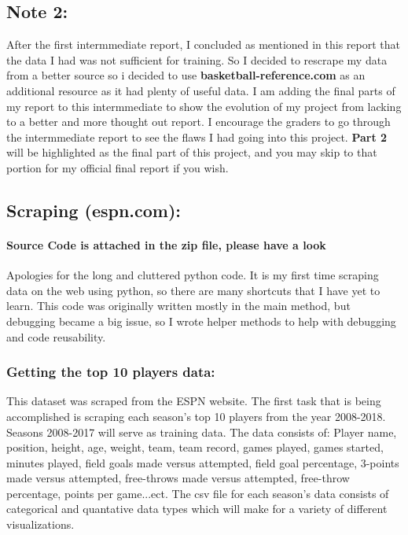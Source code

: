 \documentclass[11pt]{article}
\begin{document}
\subsection{Note 2:}\label{note-2}

After the first intermmediate report, I concluded as mentioned in this
report that the data I had was not sufficient for training. So I decided
to rescrape my data from a better source so i decided to use
\textbf{basketball-reference.com} as an additional resource as it had
plenty of useful data. I am adding the final parts of my report to this
intermmediate to show the evolution of my project from lacking to a
better and more thought out report. I encourage the graders to go
through the intermmediate report to see the flaws I had going into this
project. \textbf{Part 2} will be highlighted as the final part of this
project, and you may skip to that portion for my official final report
if you wish.

\subsection{Scraping (espn.com):}\label{scraping-espn.com}

\paragraph{Source Code is attached in the zip file, please have a
look}\label{source-code-is-attached-in-the-zip-file-please-have-a-look}

    Apologies for the long and cluttered python code. It is my first time
scraping data on the web using python, so there are many shortcuts that
I have yet to learn. This code was originally written mostly in the main
method, but debugging became a big issue, so I wrote helper methods to
help with debugging and code reusability.

\subsubsection{Getting the top 10 players
data:}\label{getting-the-top-10-players-data}

This dataset was scraped from the ESPN website. The first task that is
being accomplished is scraping each season's top 10 players from the
year 2008-2018. Seasons 2008-2017 will serve as training data. The data
consists of: Player name, position, height, age, weight, team, team
record, games played, games started, minutes played, field goals made
versus attempted, field goal percentage, 3-points made versus attempted,
free-throws made versus attempted, free-throw percentage, points per
game...ect. The csv file for each season's data consists of categorical
and quantative data types which will make for a variety of different
visualizations. \newline
\end{document}
